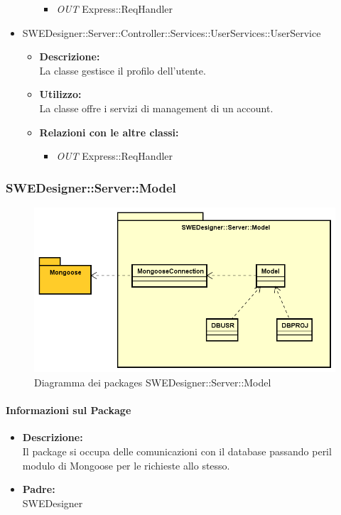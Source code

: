 \begin{itemize}
\begin{itemize}
				\begin{itemize}
					\item \emph{OUT} Express::ReqHandler
				\end{itemize}
			\end{itemize}
			\item SWEDesigner::Server::Controller::Services::UserServices::UserService
			\begin{itemize}
				\item \textbf{Descrizione: }\\
				La classe gestisce il profilo dell'utente.
				\item \textbf{Utilizzo: }\\
				La classe offre i servizi di management di un account.
				\item \textbf{Relazioni con le altre classi: }
				\begin{itemize}
					\item \emph{OUT} Express::ReqHandler
				\end{itemize}
			\end{itemize}
		\end{itemize}

		\subsubsection{SWEDesigner::Server::Model}
		 \begin{figure}[h!]
		\centering
		\includegraphics[scale=0.4]{Disegnetti/SWEDesigner__Server__Model.png}
		\caption{Diagramma dei packages SWEDesigner::Server::Model}
 		\end{figure}
		\paragraph{Informazioni sul Package}
		\begin{itemize}
			\item \textbf{Descrizione: }\\
			Il package si occupa delle comunicazioni con il database passando peril modulo di Mongoose per le richieste allo stesso.
			\item \textbf{Padre: }\\ SWEDesigner
		\end{itemize}

